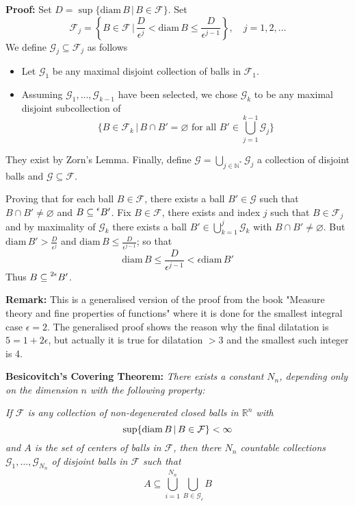 \documentclass{article}
\begin{document}
\vspace{1ex}
\textbf{Proof:}
Set $D=\sup\{\text{diam}\,B\,|\,B\in \mathcal{F}\}$. Set
\[\mathcal{F}_j=\left\{B\in\mathcal{F}\,|\,\frac{D}{\epsilon^j}<\text{diam}\,B\leq\frac{D}{\epsilon^{j-1}}\right\},\quad j=1,2,\ldots\]
We define $\mathcal{G}_j\subseteq\mathcal{F}_j$ as follows
\begin{itemize}
    \item Let $\mathcal{G}_1$ be any maximal disjoint collection of balls in
        $\mathcal{F}_1$.

    \item Assuming $\mathcal{G}_1,\ldots,\mathcal{G}_{k-1}$ have been selected,
        we chose $\mathcal{G}_k$ to be any maximal disjoint subcollection of
        \[ \{B\in\mathcal{F}_k\,|\,B\cap B'=\varnothing\text{ for all }B'\in\bigcup_{j=1}^{k-1}\mathcal{G}_j\}\]
\end{itemize}
They exist by Zorn's Lemma. Finally, define $\mathcal{G}=\bigcup_{j\in\mathbb{N}^*}\mathcal{G}_j$
a collection of disjoint balls and $\mathcal{G}\subseteq\mathcal{F}$.

\vspace{1ex}
Proving that for each ball $B\in\mathcal{F}$, there exists a ball $B'\in\mathcal{G}$
such that $B\cap B'\neq\varnothing$ and $B\subseteq\prescript{\epsilon}{}B'$. Fix
$B\in\mathcal{F}$, there exists and index $j$ such that $B\in\mathcal{F}_j$ and
by maximality of $\mathcal{G}_k$ there exists a ball $B'\in\bigcup_{k=1}^j
\mathcal{G}_k$ with $B\cap B'\neq\varnothing$. But $\text{diam}\,B'>\frac{D}{\epsilon^j}$
and $\text{diam}\,B\leq\frac{D}{\epsilon^{j-1}}$; so that
\[ \text{diam}\,B\leq \frac{D}{\epsilon^{j-1}} < \epsilon\text{diam}\,B'\]
Thus $B\subseteq\prescript{2\epsilon}{}B'$.

\vspace{1ex}
\textbf{Remark:} This is a generalised version of the proof from the book
"Measure theory and fine properties of functions" where it is done for the
smallest integral case $\epsilon = 2$. The generalised proof shows the reason
why the final dilatation is $5 = 1+2\epsilon$, but actually it is true for
dilatation $>3$ and the smallest such integer is 4.


\vspace{2ex}
\textbf{Besicovitch’s Covering Theorem:} \textit{There exists a constant $N_n$, depending
only on the dimension $n$ with the following property:}

\vspace{1ex} \textit{
If $\mathcal{F}$ is any collection of non-degenerated closed balls in
$\mathbb{R}^n$ with
\[\sup\{\textnormal{diam}\,B\,|\,B\in\mathcal F\}<\infty\]
and $A$ is the set of centers of balls in $\mathcal F$, then there $N_n$
countable collections $\mathcal{G}_1,\ldots,\mathcal{G}_{N_n}$ of disjoint
balls in $\mathcal{F}$ such that
\[A\subseteq\bigcup_{i=1}^{N_n}\bigcup_{B\in\mathcal{G_i}}B\]}
\end{document}
